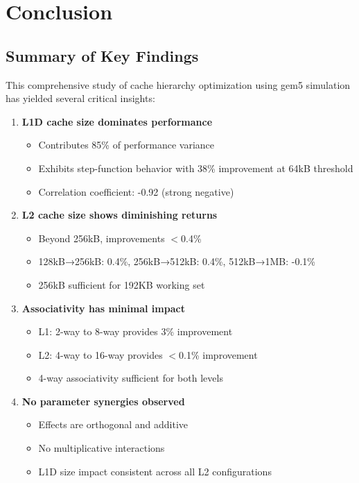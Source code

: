 \documentclass[11pt,a4paper]{article}
\begin{document}
\newpage

\section{Conclusion}

\subsection{Summary of Key Findings}

This comprehensive study of cache hierarchy optimization using gem5 simulation has yielded several critical insights:

\begin{enumerate}[noitemsep]
    \item \textbf{L1D cache size dominates performance}
    \begin{itemize}[noitemsep]
        \item Contributes 85\% of performance variance
        \item Exhibits step-function behavior with 38\% improvement at 64kB threshold
        \item Correlation coefficient: -0.92 (strong negative)
    \end{itemize}

    \item \textbf{L2 cache size shows diminishing returns}
    \begin{itemize}[noitemsep]
        \item Beyond 256kB, improvements $<$0.4\%
        \item 128kB→256kB: 0.4\%, 256kB→512kB: 0.4\%, 512kB→1MB: -0.1\%
        \item 256kB sufficient for 192KB working set
    \end{itemize}

    \item \textbf{Associativity has minimal impact}
    \begin{itemize}[noitemsep]
        \item L1: 2-way to 8-way provides 3\% improvement
        \item L2: 4-way to 16-way provides $<$0.1\% improvement
        \item 4-way associativity sufficient for both levels
    \end{itemize}

    \item \textbf{No parameter synergies observed}
    \begin{itemize}[noitemsep]
        \item Effects are orthogonal and additive
        \item No multiplicative interactions
        \item L1D size impact consistent across all L2 configurations
    \end{itemize}


\end{enumerate}
\end{document}
